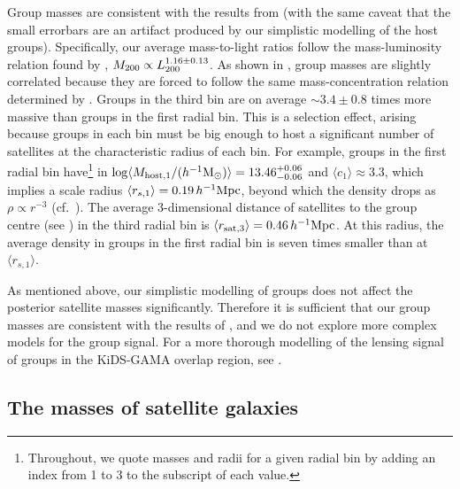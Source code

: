 Group masses are consistent with the results from \cite{viola15} (with the same caveat that 
the small errorbars are an artifact produced by our simplistic modelling of the host groups).
Specifically, our average mass-to-light ratios follow the mass-luminosity relation found by 
\cite{viola15}, $M_{\rm 200} \propto L_{200}^{1.16\pm0.13}$. As shown in , group 
masses are slightly correlated because they are forced to follow the same mass-concentration 
relation determined by . Groups in the third bin are on average $\sim3.4\pm0.8$ times 
more massive than groups in the first radial bin. This is a selection effect, arising because groups 
in each bin must be big enough to host a significant number of satellites at the characteristic 
radius of each bin. For example, groups in the first radial bin have\footnote{Throughout, we quote 
masses and radii for a given radial bin by adding an index from 1 to 3 to the subscript of each 
value.} in  $\log \langle M_{\rm 
host,1}/(h^{-1}{\rm M}_\odot) \rangle=13.46_{-0.06}^{+0.06}$ and $\langle c_1 \rangle\approx3.3$, 
which implies a scale radius $\langle r_{s,1}\rangle =0.19\,h^{-1}{\rm Mpc}$, beyond which the 
density drops as $\rho \propto r^{-3}$ (cf.\ ). The average 3-dimensional distance of 
satellites to the group centre (see ) in the third radial bin is $\langle r_{\rm 
sat,3} \rangle=0.46\,h^{-1}{\rm Mpc}$. At this radius, the average density in groups in the first 
radial bin is seven times smaller than at $\langle r_{s,1} \rangle$.

As mentioned above, our simplistic modelling of groups does not affect the posterior satellite 
masses significantly. Therefore it is sufficient that our group masses are consistent with the 
results of \cite{viola15}, and we do not explore more complex models for the group signal. For a 
more thorough modelling of the lensing signal of groups in the KiDS-GAMA overlap region, see 
\cite{viola15}.

\subsection{The masses of satellite galaxies}\label{s:masses}

